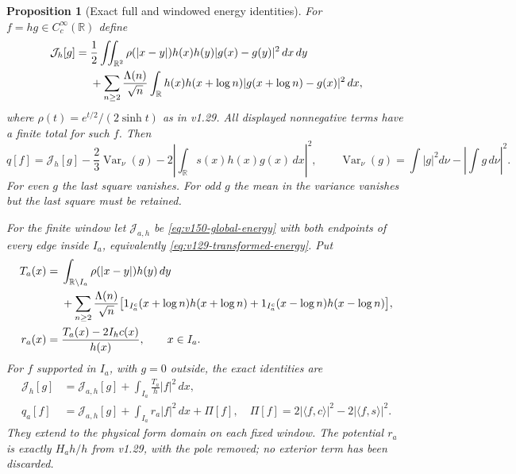 \documentclass[11pt]{article}
\newtheorem{proposition}[theorem]{Proposition}
\theoremstyle{remark}
\begin{document}
\begin{proposition}[Exact full and windowed energy identities]
\label{prop:v150-critical-energy}
For $f=hg\in C_c^\infty(\mathbb R)$ define
\begin{align}
 \mathcal J_h[g]={}&\frac12\iint_{\mathbb R^2}
       \rho(|x-y|)h(x)h(y)|g(x)-g(y)|^2\,dx\,dy\notag\\
 &+\sum_{n\ge2}\frac{\Lambda(n)}{\sqrt n}
       \int_{\mathbb R}h(x)h(x+\log n)
                    |g(x+\log n)-g(x)|^2\,dx,
 \label{eq:v150-global-energy}
\end{align}
where $\rho(t)=e^{t/2}/(2\sinh t)$ as in v1.29. All displayed
nonnegative terms have a finite total for such $f$. Then
\begin{equation}\label{eq:v150-critical-identity}
 q[f]=\mathcal J_h[g]-\frac23\operatorname{Var}_{\nu}(g)
                 -2\left|\int_{\mathbb R}s(x)h(x)g(x)\,dx\right|^2,
 \qquad
 \operatorname{Var}_{\nu}(g)=\int|g|^2d\nu-\left|\int g\,d\nu\right|^2.
\end{equation}
For even $g$ the last square vanishes. For odd $g$ the mean in the
variance vanishes but the last square must be retained.

For the finite window let $\mathcal J_{a,h}$ be
\eqref{eq:v150-global-energy} with both endpoints of every edge inside
$I_a$, equivalently \eqref{eq:v129-transformed-energy}. Put
\begin{align}
 T_a(x)={}&\int_{\mathbb R\setminus I_a}\rho(|x-y|)h(y)\,dy\notag\\
 &+\sum_{n\ge2}\frac{\Lambda(n)}{\sqrt n}
 \bigl[1_{I_a^c}(x+\log n)h(x+\log n)
       +1_{I_a^c}(x-\log n)h(x-\log n)\bigr],\label{eq:v150-exterior}\\
 r_a(x)={}&\frac{T_a(x)-2I_hc(x)}{h(x)},\qquad x\in I_a.
 \label{eq:v150-potential}
\end{align}
For $f$ supported in $I_a$, with $g=0$ outside, the exact identities are
\begin{align}
 \mathcal J_h[g]&=\mathcal J_{a,h}[g]
                +\int_{I_a}\frac{T_a}{h}|f|^2\,dx,\label{eq:v150-edge-split}\\
 q_a[f]&=\mathcal J_{a,h}[g]+\int_{I_a}r_a|f|^2\,dx+\Pi[f],
 \quad \Pi[f]=2|\langle f,c\rangle|^2-2|\langle f,s\rangle|^2.
 \label{eq:v150-local-identity}
\end{align}
They extend to the physical form domain on each fixed window.
The potential $r_a$ is exactly $H_a h/h$ from v1.29, with the pole
removed; no exterior term has been discarded.
\end{proposition}
\end{document}
